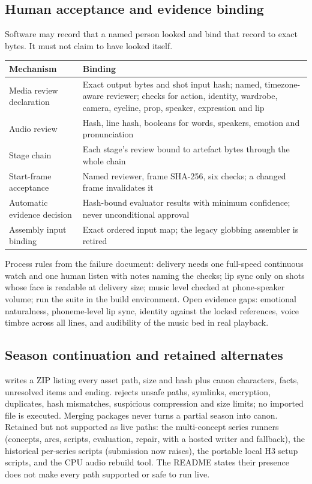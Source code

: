 \documentclass[11pt,a4paper]{article}
\newcommand{\code}[1]{\texttt{\detokenize{#1}}}
\begin{document}
\subsection{Human acceptance and evidence binding}
Software may record that a named person looked and bind that record to exact bytes. It must not claim to have looked itself.
\begin{longtable}{@{}P{4.2cm}P{11.3cm}@{}}
\toprule \textbf{Mechanism} & \textbf{Binding}\\ \midrule\endhead
Media review declaration & Exact output bytes and shot input hash; named, timezone-aware reviewer; checks for action, identity, wardrobe, camera, eyeline, prop, speaker, expression and lip\\
Audio review & Hash, line hash, booleans for words, speakers, emotion and pronunciation\\
Stage chain & Each stage's review bound to artefact bytes through the whole chain\\
Start-frame acceptance & Named reviewer, frame SHA-256, six checks; a changed frame invalidates it\\
Automatic evidence decision & Hash-bound evaluator results with minimum confidence; never unconditional approval\\
Assembly input binding & Exact ordered input map; the legacy globbing assembler is retired\\
\bottomrule
\end{longtable}
Process rules from the failure document: delivery needs one full-speed continuous watch and one human listen with notes naming the checks; lip sync only on shots whose face is readable at delivery size; music level checked at phone-speaker volume; run the suite in the build environment. Open evidence gaps: emotional naturalness, phoneme-level lip sync, identity against the locked references, voice timbre across all lines, and audibility of the music bed in real playback.

\subsection{Season continuation and retained alternates}
\code{pack-season} writes a ZIP listing every asset path, size and hash plus canon characters, facts, unresolved items and ending. \code{inspect-season} rejects unsafe paths, symlinks, encryption, duplicates, hash mismatches, suspicious compression and size limits; no imported file is executed. Merging packages never turns a partial season into canon. Retained but not supported as live paths: the multi-concept series runners (concepts, arcs, scripts, evaluation, repair, with a hosted writer and fallback), the historical per-series scripts (submission now raises), the portable local H3 setup scripts, and the CPU audio rebuild tool. The README states their presence does not make every path supported or safe to run live.
\end{document}
